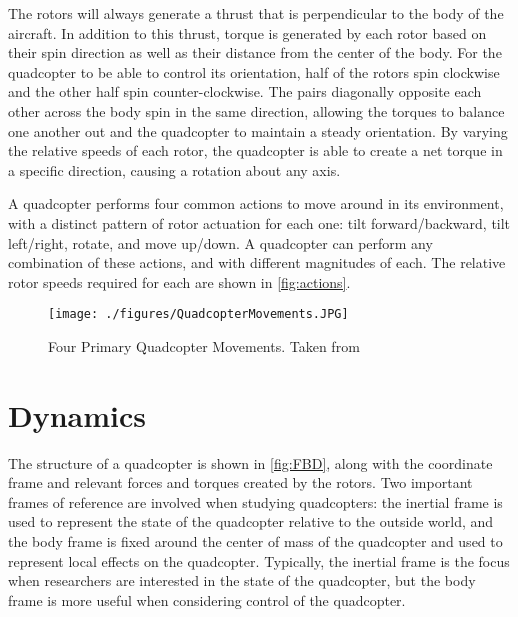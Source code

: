 \documentclass[letterpaper,12pt,titlepage,oneside,final]{book}
\begin{document}
The rotors will always generate a thrust that is perpendicular to the body of the aircraft. 
In addition to this thrust, torque is generated by each rotor based on their spin direction  as well as their distance from the center of the body.
For the quadcopter to be able to control its orientation, half of the rotors spin clockwise and the other half spin counter-clockwise. 
The pairs diagonally opposite each other across the body spin in the same direction, allowing the torques to balance one another out and the quadcopter to maintain a steady orientation. 
By varying the relative speeds of each rotor, the quadcopter is able to create a net torque in a specific direction, causing a rotation about any axis.

A quadcopter performs four common actions to move around in its environment, with a distinct pattern of rotor actuation for each one: 
tilt forward/backward, tilt left/right, rotate, and move up/down. 
A quadcopter can perform any combination of these actions, and with different magnitudes of each. The relative rotor speeds required for each are shown in \autoref{fig:actions}.

\begin{figure}
\centering
\texttt{[image: ./figures/QuadcopterMovements.JPG]}
\caption{Four Primary Quadcopter Movements. Taken from \cite{harsha}}
\label{fig:actions}
\end{figure}


\section{Dynamics} \label{sec:dynamics}


The structure of a quadcopter is shown in \autoref{fig:FBD}, along with the coordinate frame and relevant forces and torques created by the rotors.
Two important frames of reference are involved when studying quadcopters: the inertial frame is used to represent the state of the quadcopter relative to the outside world, and the body frame is fixed around the center of mass of the quadcopter and used to represent local effects on the quadcopter.
Typically, the inertial frame is the focus when researchers are interested in the state of the quadcopter, but the body frame is more useful when considering control of the quadcopter.
\end{document}
